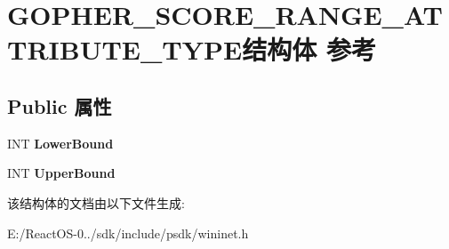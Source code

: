 \hypertarget{struct_g_o_p_h_e_r___s_c_o_r_e___r_a_n_g_e___a_t_t_r_i_b_u_t_e___t_y_p_e}{}\section{G\+O\+P\+H\+E\+R\+\_\+\+S\+C\+O\+R\+E\+\_\+\+R\+A\+N\+G\+E\+\_\+\+A\+T\+T\+R\+I\+B\+U\+T\+E\+\_\+\+T\+Y\+P\+E结构体 参考}
\label{struct_g_o_p_h_e_r___s_c_o_r_e___r_a_n_g_e___a_t_t_r_i_b_u_t_e___t_y_p_e}
\subsection*{Public 属性}
\begin{DoxyCompactItemize}
\item 
\mbox{\label{struct_g_o_p_h_e_r___s_c_o_r_e___r_a_n_g_e___a_t_t_r_i_b_u_t_e___t_y_p_e_a3b5e29cac6fa8416f588e28f3fe6e95c}} 
I\+NT {\bfseries Lower\+Bound}
\item 
\mbox{\label{struct_g_o_p_h_e_r___s_c_o_r_e___r_a_n_g_e___a_t_t_r_i_b_u_t_e___t_y_p_e_a8bf21b98cc24de2bb6873541ed77029c}} 
I\+NT {\bfseries Upper\+Bound}
\end{DoxyCompactItemize}


该结构体的文档由以下文件生成\+:\begin{DoxyCompactItemize}
\item 
E\+:/\+React\+O\+S-\/0../sdk/include/psdk/wininet.\+h\end{DoxyCompactItemize}
